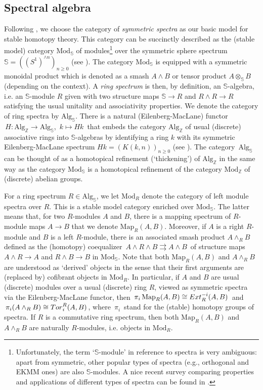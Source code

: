 \documentclass[11pt]{amsart}
\theoremstyle{definition}
\theoremstyle{remark}
\numberwithin{equation}{section}
\newcommand{\la}{\label}
\newcommand{\Map}{\mathrm{Map}}
\def\bS{\mathbb S}
\def\Z{\mathbb{Z}}
\def\Mod{\mathrm{Mod}}
\def\Alg{\mathrm{Alg}}
\begin{document}
%
\subsection{Spectral algebra}
\la{S7.1}
Following \cite{DGI06}, we choose the category of {\it symmetric spectra} as our basic model for 
stable homotopy theory. This category can be succinctly described as the (stable model) category $ \Mod_{\bS} $ of modules\footnote{Unfortunately, the term `$\bS$-module' in reference to spectra is very ambiguous: apart from symmetric, other popular types of spectra (e.g., orthogonal and EKMM ones) are also $\bS$-modules. A nice recent survey comparing properties and applications of different types of spectra can be found in \cite{D22}.} over the symmetric sphere spectrum $ \bS = ((S^1)^{\wedge n})_{n \ge 0}$ (see \cite{HHS00}). The category $\Mod_{\bS}$ is equipped with a symmetric monoidal product which is denoted  as a smash $ A \wedge B $ or tensor product $ A \otimes_{\bS} B $ (depending on the context). A {\it ring spectrum} is then, by definition, an $\bS$-algebra, i.e. an $\bS$-module  $ R $ given with two structure maps $ \bS \to R $ and $ R \wedge R \to R $ satisfying the usual unitality and associativity properties.  We denote the category of ring spectra by $\Alg_{\bS}$. There is
a natural (Eilenberg-MacLane) functor $\, H: \Alg_{\Z} \to \Alg_{\bS} $, $\,k \mapsto Hk \,$
that embeds the category $ \Alg_{\Z}$ of usual (discrete) associative rings into $\bS$-algebras by identifying a ring $k$
with its symmetric Eilenberg-MacLane spectrum $ Hk= (K(k,n))_{n \ge 0} $ (see \cite[1.2.5]{HHS00}).
The category $\,\Alg_{\bS}\,$ can be thought of as a homotopical refinement (`thickening') of  $ \Alg_{\Z} $ in the same way as the category $ \Mod_{\bS}$ is a homotopical refinement of 
the category $ \Mod_{\Z} $ of (discrete) abelian groups. 

For a ring spectrum $R \in \Alg_{\bS} $, we let $ \Mod_{R}$ denote the category of left module spectra over $R$. This is a stable model category enriched over $ \Mod_{\bS} $. The latter means that, for two $R$-modules $A$ and $B$, there is a mapping spectrum of $R$-module maps $ A \to B $ that we denote $ \Map_R(A,B) $. Moreover, if $ A $ is a right $R$-module and $B$ is a left $R$-module, there is an
associated smash product $ A \wedge_R B $ defined as the (homotopy) coequalizer $\, A\wedge R \wedge B 
\rightrightarrows A \wedge B \,$ of structure maps $ A \wedge R \to A $ and $ R \wedge B \to B $
in $ \Mod_{\bS}$. Note that both $ \Map_R(A,B) $ and $ A \wedge_R B $ are understood as `derived' objects
in the sense that their first arguments are (replaced by) cofibrant objects in $\Mod_R $. In particular,
if $A$ and $B$ are usual (discrete) modules over a usual (discrete) ring $R$, viewed as symmetric 
spectra via the Eilenberg-MacLane functor, then $\,\pi_i\, \Map_R(A,B) \cong {\rm Ext}_{R}^{-i}(A,B)\,$ and $\, 
\pi_i(A \wedge_R B) \cong {\rm Tor}^R_{i}(A,B)\,$, where $\, \pi_i \,$ stand for the (stable) homotopy groups of spectra. If $R$ is a commutative ring spectrum, then both $ \Map_R(A,B) $ and $ A \wedge_R B $ are naturally $R$-modules, i.e. objects in $ \Mod_R $.
\end{document}
